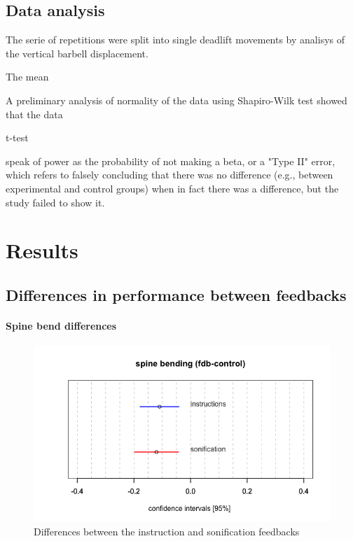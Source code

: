\documentclass[10pt,letterpaper]{article}
\begin{document}
\subsection*{Data analysis}

 
The serie of repetitions were split into single deadlift movements by analisys of the vertical barbell displacement. 



The mean  


A preliminary analysis of normality of the data using Shapiro-Wilk test showed that the data

t-test 


speak of power as the probability of not making a beta, or a "Type II" error, which refers to falsely concluding that there was no difference (e.g., between experimental and control groups) when in fact there was a difference, but the study failed to show it.











\section*{Results} \label{sec:results}



\subsection*{Differences in performance between feedbacks}


\paragraph{Spine bend differences}

\begin{figure}[!h]
\center
  \includegraphics[width=.5\textwidth]{figures/CI_spine_bending.png} 
  \caption{Differences between the instruction and sonification feedbacks} 
  \label{fig:boxplot}      
\end{figure}
\end{document}
